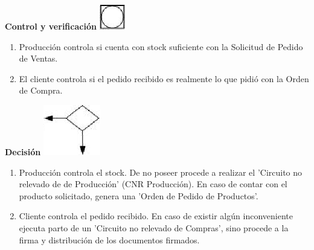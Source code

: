 \begin{center}
  \textbf{Control y verificaci\'on}
  \includegraphics{./Images/Simbolos/simbolo-Control-y-Verificacion.png}
\end{center}
\begin{enumerate}
	\item Producci\'on controla si cuenta con stock suficiente con la Solicitud de Pedido de Ventas.
	\item El cliente controla si el pedido recibido es realmente lo que pidi\'o con la Orden de Compra.
\end{enumerate}
\pagebreak

\begin{center}
  \textbf{Decisi\'on}
  \includegraphics{./Images/Simbolos/simbolo-Decision.png}
\end{center}
\begin{enumerate}
  \item Producci\'on controla el stock. De no poseer procede a realizar el 'Circuito no relevado de de Producci\'on' (CNR Producci\'on). En caso de contar con el producto solicitado, genera una 'Orden de Pedido de Productos'.
  \item Cliente controla el pedido recibido. En caso de existir alg\'un inconveniente ejecuta parto de un 'Circuito no relevado de Compras', sino procede a la firma y distribuci\'on de los documentos firmados.
\end{enumerate}

